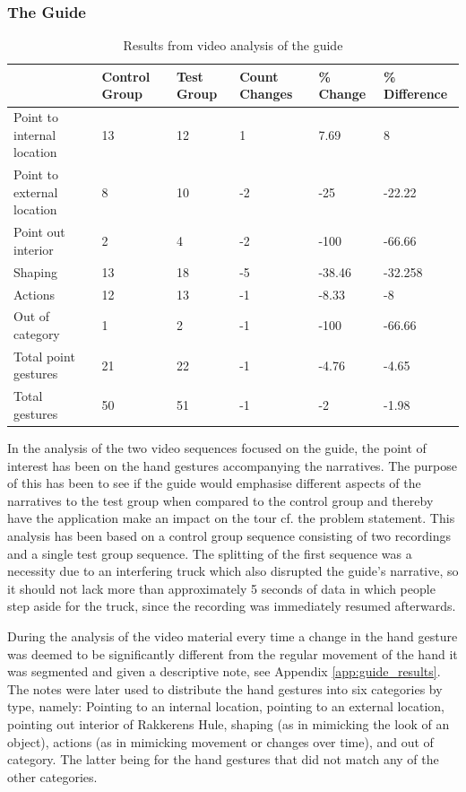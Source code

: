 \subsubsection{The Guide}
\begin{table}
\begin{tabular}{| p{3cm} | p{1.6cm} | p{1.4cm} | p{1.6cm} | p{1.8cm} | p{2.2cm} |}\hline
  & Control Group & Test Group & Count Changes & \% Change & \% Difference \\ \hline
Point to internal location & 13 & 12 & 1 & 7.69 & 8 \\ \hline
Point to external location & 8 & 10 & -2 & -25 & -22.22 \\ \hline
Point out interior & 2 & 4 & -2 & -100 & -66.66 \\ \hline
Shaping & 13 & 18 & -5 & -38.46 & -32.258 \\ \hline
Actions & 12 & 13 & -1 & -8.33 & -8 \\ \hline
Out of category & 1 & 2 & -1 & -100 & -66.66 \\ \hline
Total point gestures & 21 & 22 & -1 & -4.76 & -4.65 \\ \hline
Total gestures & 50 & 51 & -1 & -2 & -1.98 \\ \hline
\end{tabular}
\caption{Results from video analysis of the guide \label{table:guide}}
\end{table}

In the analysis of the two video sequences focused on the guide, the point of interest has been on the hand gestures accompanying the narratives. The purpose of this has been to see if the guide would emphasise different aspects of the narratives to the test group when compared to the control group and thereby have the application make an impact on the tour cf. the problem statement. This analysis has been based on a control group sequence consisting of two recordings and a single test group sequence. The splitting of the first sequence was a necessity due to an interfering truck which also disrupted the guide’s narrative, so it should not lack more than approximately 5 seconds of data in which people step aside for the truck, since the recording was immediately resumed afterwards.

During the analysis of the video material every time a change in the hand gesture was deemed to be significantly different from the regular movement of the hand it was segmented and given a descriptive note, see Appendix \ref{app:guide_results}. The notes were later used to distribute the hand gestures into six categories by type, namely: Pointing to an internal location, pointing to an external location, pointing out interior of Rakkerens Hule, shaping (as in mimicking the look of an object), actions (as in mimicking movement or changes over time), and out of category. The latter being for the hand gestures that did not match any of the other categories.

